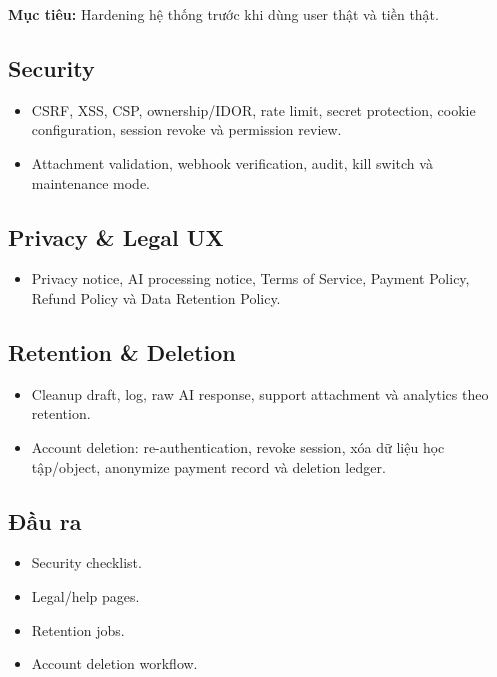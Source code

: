 \documentclass[
  11pt,
  a4paper,
]{article}
\begin{document}
\textbf{Mục tiêu:} Hardening hệ thống trước khi dùng user thật và tiền
thật.

\subsection{Security}\label{security}

\begin{itemize}
\item
  CSRF, XSS, CSP, ownership/IDOR, rate limit, secret protection, cookie
  configuration, session revoke và permission review.
\item
  Attachment validation, webhook verification, audit, kill switch và
  maintenance mode.
\end{itemize}

\subsection{Privacy \& Legal UX}\label{privacy-legal-ux}

\begin{itemize}
\item
  Privacy notice, AI processing notice, Terms of Service, Payment
  Policy, Refund Policy và Data Retention Policy.
\end{itemize}

\subsection{Retention \& Deletion}\label{retention-deletion}

\begin{itemize}
\item
  Cleanup draft, log, raw AI response, support attachment và analytics
  theo retention.
\item
  Account deletion: re-authentication, revoke session, xóa dữ liệu học
  tập/object, anonymize payment record và deletion ledger.
\end{itemize}

\subsection{Đầu ra}\label{ux111ux1ea7u-ra-12}

\begin{itemize}
\item
  Security checklist.
\item
  Legal/help pages.
\item
  Retention jobs.
\item
  Account deletion workflow.
\end{itemize}
\end{document}
